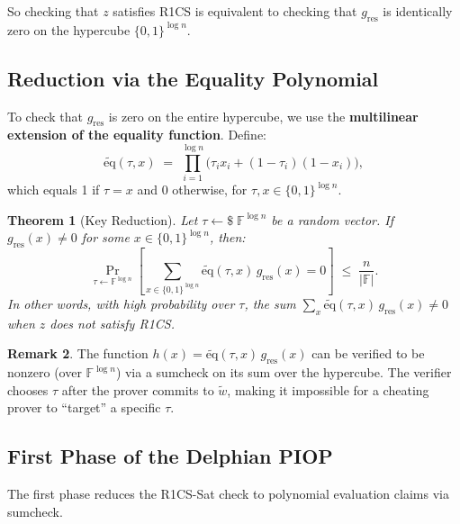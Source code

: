 \documentclass[11pt]{article}
\theoremstyle{plain}
\newtheorem{theorem}{Theorem}[section]
\theoremstyle{definition}
\newtheorem{remark}[theorem]{Remark}
\newcommand{\F}{\mathbb{F}}
\begin{document}
So checking that $z$ satisfies R1CS is equivalent to checking that
$g_{\mathrm{res}}$ is identically zero on the hypercube $\{0,1\}^{\log n}$.

\subsection{Reduction via the Equality Polynomial}

To check that $g_{\mathrm{res}}$ is zero on the entire hypercube, we use the
\textbf{multilinear extension of the equality function}. Define:
\[
  \widetilde{\mathrm{eq}}(\tau, x) \;=\; \prod_{i=1}^{\log n}
    \bigl(\tau_i x_i + (1 - \tau_i)(1 - x_i)\bigr),
\]
which equals 1 if $\tau = x$ and 0 otherwise, for $\tau, x \in \{0,1\}^{\log n}$.

\begin{theorem}[Key Reduction]
  Let $\tau \leftarrow \$\; \F^{\log n}$ be a random vector. If
  $g_{\mathrm{res}}(x) \neq 0$ for some $x \in \{0,1\}^{\log n}$, then:
  \[
    \Pr_{\tau \leftarrow \F^{\log n}}\!\left[
      \sum_{x \in \{0,1\}^{\log n}} \widetilde{\mathrm{eq}}(\tau, x)\, g_{\mathrm{res}}(x) = 0
    \right] \;\leq\; \frac{n}{|\F|}.
  \]
  In other words, with high probability over $\tau$, the sum
  $\sum_x \widetilde{\mathrm{eq}}(\tau, x)\, g_{\mathrm{res}}(x) \neq 0$ when
  $z$ does not satisfy R1CS.
\end{theorem}

\begin{remark}
  The function $h(x) = \widetilde{\mathrm{eq}}(\tau, x)\, g_{\mathrm{res}}(x)$
  can be verified to be nonzero (over $\F^{\log n}$) via a sumcheck on its sum
  over the hypercube. The verifier chooses $\tau$ after the prover commits to
  $\tilde{w}$, making it impossible for a cheating prover to ``target'' a specific
  $\tau$.
\end{remark}

\subsection{First Phase of the Delphian PIOP}

The first phase reduces the R1CS-Sat check to polynomial evaluation claims via
sumcheck.
\end{document}
